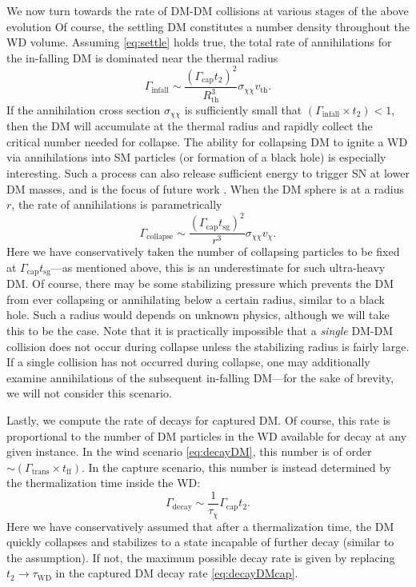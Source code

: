 We now turn towards the rate of DM-DM collisions at various stages of the above evolution
Of course, the settling DM constitutes a number density throughout the WD volume.
Assuming \eqref{eq:settle} holds true, the total rate of annihilations for the in-falling DM is dominated near the thermal radius
\begin{equation}
\label{eq:infall}
\Gamma_\text{infall} \sim \frac{(\Gamma_\text{cap} t_2)^2}{R_\text{th}^3} \sigma_{\chi \chi} v_\text{th}. 
\end{equation}
If the annihilation cross section $\sigma_{\chi \chi}$ is sufficiently small that $(\Gamma_\text{infall} \times t_2) < 1$, then the DM will accumulate at the thermal radius and rapidly collect the critical number needed for collapse. 
The ability for collapsing DM to ignite a WD via annihilations into SM particles (or formation of a black hole) is especially interesting. 
Such a process can also release sufficient energy to trigger SN at lower DM masses, and is the focus of future work \cite{us}.
When the DM sphere is at a radius $r$, the rate of annihilations is parametrically
\begin{equation}
\Gamma_\text{collapse} \sim \frac{(\Gamma_\text{cap} t_\text{sg})^2}{r^3} \sigma_{\chi \chi} v_\chi. 
\end{equation}
Here we have conservatively taken the number of collapsing particles to be fixed at $\Gamma_\text{cap} t_\text{sg}$---as mentioned above, this is an underestimate for such ultra-heavy DM.
Of course, there may be some stabilizing pressure which prevents the DM from ever collapsing or annihilating below a certain radius, similar to a black hole. 
Such a radius would depends on unknown physics, although we will take this to be the case. 
Note that it is practically impossible that a \emph{single} DM-DM collision does not occur during collapse unless the stabilizing radius is fairly large.
If a single collision has not occurred during collapse, one may additionally examine annihilations of the subsequent in-falling DM---for the sake of brevity, we will not consider this scenario. 

Lastly, we compute the rate of decays for captured DM.  
Of course, this rate is proportional to the number of DM particles in the WD available for decay at any given instance.  
In the wind scenario \eqref{eq:decayDM}, this number is of order $\sim (\Gamma_\text{trans} \times t_\text{ff})$.  
In the capture scenario, this number is instead determined by the thermalization time inside the WD:
\begin{equation}
\Gamma_\text{decay} \sim  \frac{1}{\tau_\chi} \Gamma_\text{cap} t_2.
\label{eq:decayDMcap}
\end{equation}
Here we have conservatively assumed that after a thermalization time, the DM quickly collapses and stabilizes to a state incapable of further decay (similar to the assumption).
If not, the maximum possible decay rate is given by replacing $t_2 \to \tau_\text{WD}$ in the captured DM decay rate \eqref{eq:decayDMcap}.